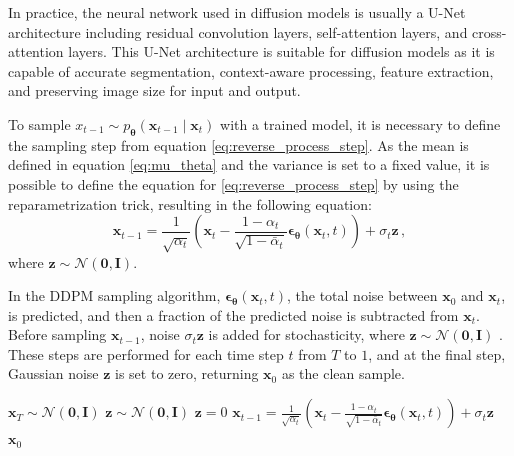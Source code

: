 In practice, the neural network used in diffusion models is usually a U-Net architecture including residual convolution layers, self-attention layers, and cross-attention layers. This U-Net architecture is suitable for diffusion models as it is capable of accurate segmentation, context-aware processing, feature extraction, and preserving image size for input and output.\cite{zhan2025conditionalimagesynthesisdiffusion}

To sample $x_{t-1} \sim  p_{\boldsymbol{\theta}}\left(\mathbf{x}_{t-1} \mid \mathbf{x}_t\right)$ with a trained model, it is necessary to define the sampling step from equation \ref{eq:reverse_process_step}. As the mean is defined in equation \ref{eq:mu_theta} and the variance is set to a fixed value, it is possible to define the equation for \ref{eq:reverse_process_step} by using the reparametrization trick, resulting in the following equation:
\begin{equation}
    \mathbf{x}_{t-1} = \frac{1}{\sqrt{\alpha_t}} \left( \mathbf{x}_t - \frac{1-\alpha_t}{\sqrt{1-\bar{\alpha}_t}} \boldsymbol{\epsilon}_{\boldsymbol{\theta}} \left(\mathbf{x}_{t},t\right) \right) + \sigma_t \mathbf{z} \,,
\label{eq:sampling_step}
\end{equation}
where $\mathbf{z} \sim \mathcal{N}(\mathbf{0}, \mathbf{I})$. \cite{ho2020denoisingdiffusionprobabilisticmodels}

In the DDPM sampling algorithm, $\boldsymbol{\epsilon}_{\boldsymbol{\theta}} \left(\mathbf{x}_{t},t\right)$, the total noise between $\mathbf{x}_0$ and $\mathbf{x}_t$, is predicted, and then a fraction of the predicted noise is subtracted from $\mathbf{x}_t$. Before sampling $\mathbf{x}_{t-1}$, noise $\sigma_t \mathbf{z}$ is added for stochasticity, where $\mathbf{z} \sim \mathcal{N}(\mathbf{0}, \mathbf{I})$ \cite{shah2024enhancingdiffusionmodelshighquality}. These steps are performed for each time step $t$ from $T$ to $1$, and at the final step, Gaussian noise $\mathbf{z}$ is set to zero, returning $\mathbf{x}_0$ as the clean sample. \cite{ho2020denoisingdiffusionprobabilisticmodels}

\begin{algorithm}[H]
\caption{Sampling DDPM \cite{ho2020denoisingdiffusionprobabilisticmodels}}
\label{alg:sampling_ddpm}
\begin{algorithmic}[1]
\State $\mathbf{x}_T \sim \mathcal{N}(\mathbf{0}, \mathbf{I})$ 
 
        \State $\mathbf{z} \sim \mathcal{N}(\mathbf{0}, \mathbf{I})$ 
    \Else
        \State $\mathbf{z} = 0$
    \EndIf
    \State $\mathbf{x}_{t-1} = \frac{1}{\sqrt{\alpha_t}} \left( \mathbf{x}_t - \frac{1-\alpha_t}{\sqrt{1-\bar{\alpha}_t}} \boldsymbol{\epsilon}_{\boldsymbol{\theta}} \left(\mathbf{x}_{t},t\right) \right) + \sigma_t \mathbf{z}$ 
\EndFor
\State \Return $\mathbf{x}_0$ 
\end{algorithmic}
\end{algorithm}

